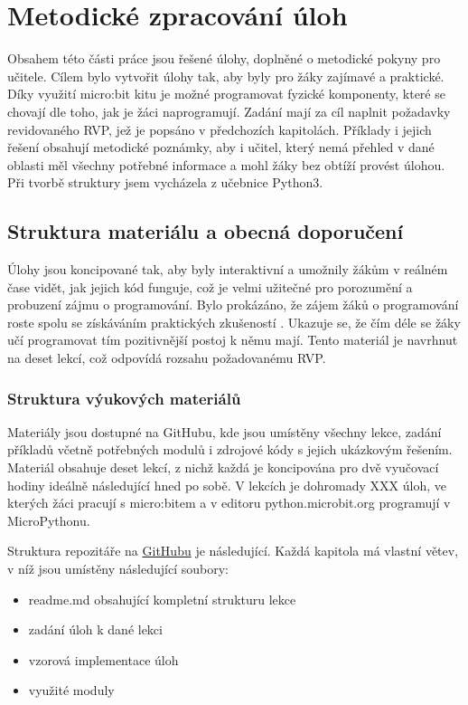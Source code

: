 \documentclass[
  digital,     %
  oneside,     %
  nosansbold,  %
  colorbold, %
  lof,         %
  nolot,         %
]{fithesis4}
\begin{document}
\chapter{Metodické zpracování úloh}
Obsahem této části práce jsou řešené úlohy, doplněné o metodické pokyny pro učitele. Cílem bylo vytvořit úlohy tak, aby byly pro žáky zajímavé a praktické. Díky využití micro:bit kitu je možné programovat fyzické komponenty, které se chovají dle toho, jak je žáci naprogramují. Zadání mají za cíl naplnit požadavky revidovaného RVP, jež je popsáno v předchozích kapitolách. Příklady i jejich řešení obsahují metodické poznámky, aby i učitel, který nemá přehled v dané oblasti měl všechny potřebné informace a mohl žáky bez obtíží provést úlohou. Při tvorbě struktury jsem vycházela z učebnice Python3.

\section{Struktura materiálu a obecná doporučení}
Úlohy jsou koncipované tak, aby byly interaktivní a umožnily žákům v reálném čase vidět, jak jejich kód funguje, což je velmi užitečné pro porozumění a probuzení zájmu o programování. Bylo prokázáno, že zájem žáků o programování roste spolu se získáváním praktických zkušeností \cite{Fagerlund22}. Ukazuje se, že čím déle se žáky učí programovat tím pozitivnější postoj k němu mají. Tento materiál je navrhnut na deset lekcí, což odpovídá rozsahu požadovanému RVP.

\subsection{Struktura výukových materiálů} %

Materiály jsou dostupné na GitHubu, kde jsou umístěny všechny lekce, zadání příkladů včetně potřebných modulů i zdrojové kódy s jejich ukázkovým řešením. Materiál obsahuje deset lekcí, z nichž každá je koncipována pro dvě vyučovací hodiny ideálně následující hned po sobě. V lekcích je dohromady XXX %
úloh, ve kterých žáci pracují s micro:bitem a v editoru python.microbit.org programují v MicroPythonu.

Struktura repozitáře na \href{https://github.com/denisa-mat/BP-microbit}{GitHubu} je následující. Každá kapitola má vlastní větev, v níž jsou umístěny následující soubory:
\begin{itemize}
    \item readme.md obsahující kompletní strukturu lekce
    \item zadání úloh k dané lekci
    \item vzorová implementace úloh
    \item využité moduly
\end{itemize}
\end{document}
